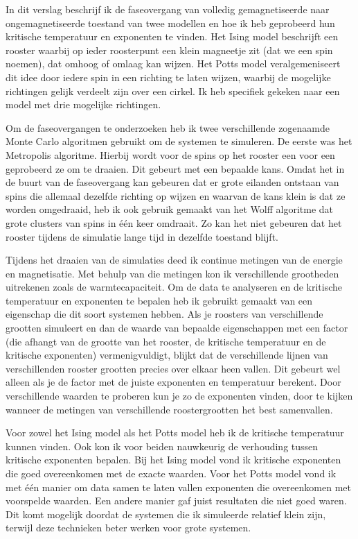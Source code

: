 \documentclass[11pt, a4paper]{report} %
\begin{document}
In dit verslag beschrijf ik de faseovergang van volledig gemagnetiseerde naar ongemagnetiseerde toestand van twee modellen en hoe ik heb geprobeerd hun kritische temperatuur en exponenten te vinden.
Het Ising model beschrijft een rooster waarbij op ieder roosterpunt een klein magneetje zit (dat we een spin noemen), dat omhoog of omlaag kan wijzen.
Het Potts model veralgemeniseert dit idee door iedere spin in een richting te laten wijzen, waarbij de mogelijke richtingen gelijk verdeelt zijn over een cirkel.
Ik heb specifiek gekeken naar een model met drie mogelijke richtingen.

Om de faseovergangen te onderzoeken heb ik twee verschillende zogenaamde Monte Carlo algoritmen gebruikt om de systemen te simuleren.
De eerste was het Metropolis algoritme.
Hierbij wordt voor de spins op het rooster een voor een geprobeerd ze om te draaien. Dit gebeurt met een bepaalde kans.
Omdat het in de buurt van de faseovergang kan gebeuren dat er grote eilanden ontstaan van spins die allemaal dezelfde richting op wijzen en waarvan de kans klein is dat ze worden omgedraaid, heb ik ook gebruik gemaakt van het Wolff algoritme dat grote clusters van spins in één keer omdraait.
Zo kan het niet gebeuren dat het rooster tijdens de simulatie lange tijd in dezelfde toestand blijft.

Tijdens het draaien van de simulaties deed ik continue metingen van de energie en magnetisatie.
Met behulp van die metingen kon ik verschillende grootheden uitrekenen zoals de warmtecapaciteit.
Om de data te analyseren en de kritische temperatuur en exponenten te bepalen  heb ik gebruikt gemaakt van een eigenschap die dit soort systemen hebben.
Als je roosters van verschillende grootten simuleert en dan de waarde van bepaalde eigenschappen met een factor (die afhangt van de grootte van het rooster, de kritische temperatuur en de kritische exponenten) vermenigvuldigt, blijkt dat de verschillende lijnen van verschillenden rooster grootten precies over elkaar heen vallen.
Dit gebeurt wel alleen als je de factor met de juiste exponenten en temperatuur berekent.
Door verschillende waarden te proberen kun je zo de exponenten vinden, door te kijken wanneer de metingen van verschillende roostergrootten het best samenvallen.

Voor zowel het Ising model als het Potts model heb ik de kritische temperatuur kunnen vinden.
Ook kon ik voor beiden nauwkeurig de verhouding tussen kritische exponenten bepalen.
Bij het Ising model vond ik kritische exponenten die goed overeenkomen met de exacte waarden.
Voor het Potts model vond ik met één manier om data samen te laten vallen exponenten die overeenkomen met voorspelde waarden.
Een andere manier gaf juist resultaten die niet goed waren.
Dit komt mogelijk doordat de systemen die ik simuleerde relatief klein zijn, terwijl deze technieken beter werken voor grote systemen.
\end{document}
